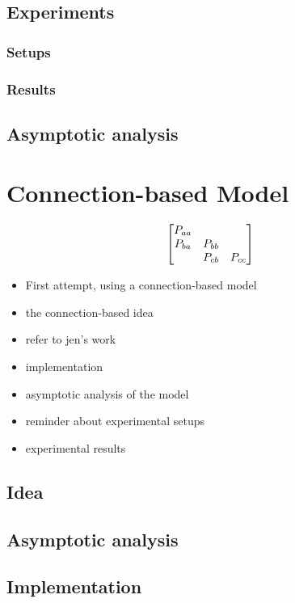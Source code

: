 \documentclass[11pt, a4paper]{report}
\begin{document}
\section{Experiments}
\subsection{Setups}
\subsection{Results}
\section{Asymptotic analysis}

\chapter{Connection-based Model}
\label{cha:conn-based-model}

\[
\begin{bmatrix}
  P_{aa} & \empty & \empty\\
  P_{ba} & P_{bb} & \empty\\
  \empty & P_{cb} & P_{cc}
\end{bmatrix}
\]

\begin{itemize}
\item First attempt, using a connection-based model
\item the connection-based idea
\item refer to jen's work
\item implementation
\item asymptotic analysis of the model
\item reminder about experimental setups
\item experimental results
\end{itemize}

\section{Idea}
\section{Asymptotic analysis}
\section{Implementation}
\end{document}
